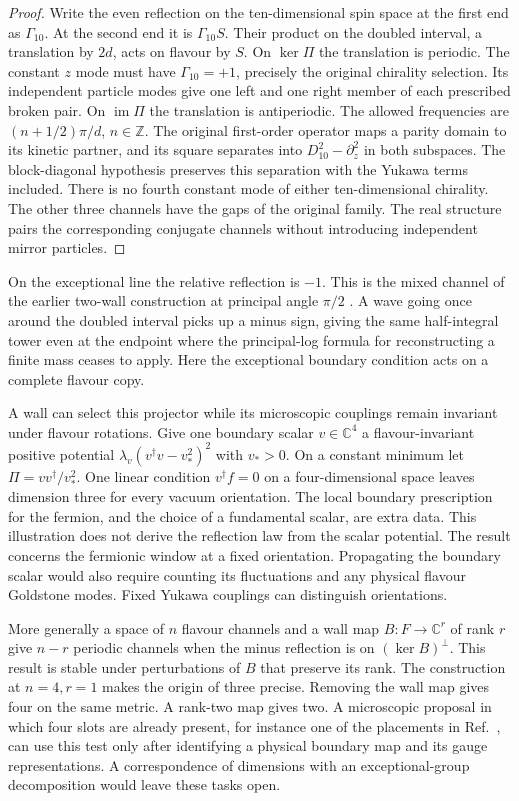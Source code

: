 \documentclass[aps,prd,reprint,onecolumn,nofootinbib,amsmath,amssymb]{revtex4-2}
\begin{document}
\begin{proof}
Write the even reflection on the ten-dimensional spin space at the first end as $\Gamma_{10}$. At the second end it is $\Gamma_{10}S$. Their product on the doubled interval, a translation by $2d$, acts on flavour by $S$. On $\ker\Pi$ the translation is periodic. The constant $z$ mode must have $\Gamma_{10}=+1$, precisely the original chirality selection. Its independent particle modes give one left and one right member of each prescribed broken pair. On $\operatorname{im}\Pi$ the translation is antiperiodic. The allowed frequencies are $(n+1/2)\pi/d$, $n\in\mathbb Z$. The original first-order operator maps a parity domain to its kinetic partner, and its square separates into $D_{10}^2-\partial_z^2$ in both subspaces. The block-diagonal hypothesis preserves this separation with the Yukawa terms included. There is no fourth constant mode of either ten-dimensional chirality. The other three channels have the gaps of the original family. The real structure pairs the corresponding conjugate channels without introducing independent mirror particles.
\end{proof}

On the exceptional line the relative reflection is $-1$. This is the mixed channel of the earlier two-wall construction at principal angle $\pi/2$ \cite{boundarynote}. A wave going once around the doubled interval picks up a minus sign, giving the same half-integral tower even at the endpoint where the principal-log formula for reconstructing a finite mass ceases to apply. Here the exceptional boundary condition acts on a complete flavour copy.

A wall can select this projector while its microscopic couplings remain invariant under flavour rotations. Give one boundary scalar $v\in\mathbb C^4$ a flavour-invariant positive potential $\lambda_v(v^\dagger v-v_*^2)^2$ with $v_*>0$. On a constant minimum let $\Pi=vv^\dagger/v_*^2$. One linear condition $v^\dagger f=0$ on a four-dimensional space leaves dimension three for every vacuum orientation. The local boundary prescription for the fermion, and the choice of a fundamental scalar, are extra data. This illustration does not derive the reflection law from the scalar potential. The result concerns the fermionic window at a fixed orientation. Propagating the boundary scalar would also require counting its fluctuations and any physical flavour Goldstone modes. Fixed Yukawa couplings can distinguish orientations.

More generally a space of $n$ flavour channels and a wall map $B:F\to\mathbb C^r$ of rank $r$ give $n-r$ periodic channels when the minus reflection is on $(\ker B)^\perp$. This result is stable under perturbations of $B$ that preserve its rank. The construction at $n=4,r=1$ makes the origin of three precise. Removing the wall map gives four on the same metric. A rank-two map gives two. A microscopic proposal in which four slots are already present, for instance one of the placements in Ref.~\cite{gennote}, can use this test only after identifying a physical boundary map and its gauge representations. A correspondence of dimensions with an exceptional-group decomposition would leave these tasks open.
\end{document}
